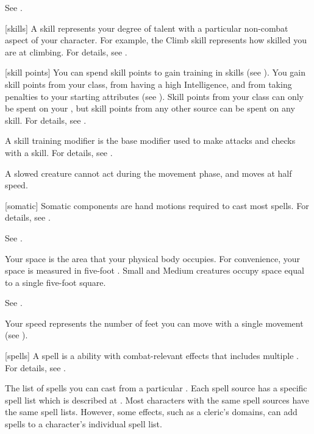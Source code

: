  See .

[skills] A skill represents your degree of talent with a particular non-combat aspect of your character.
For example, the Climb skill represents how skilled you are at climbing.
For details, see .

[skill points] You can spend skill points to gain training in skills (see ).
You gain skill points from your class, from having a high Intelligence, and from taking penalties to your starting attributes (see ).
Skill points from your class can only be spent on your , but skill points from any other source can be spent on any skill.
For details, see .

 A skill training modifier is the base modifier used to make attacks and checks with a skill.
For details, see .

 A slowed creature cannot act during the movement phase, and moves at half speed.

[somatic] Somatic components are hand motions required to cast most spells.
For details, see .

 See .

 Your space is the area that your physical body occupies.
For convenience, your space is measured in five-foot .
Small and Medium creatures occupy space equal to a single five-foot square.

 See .

 Your speed represents the number of feet you can move with a single movement (see ).

[spells] A spell is a  ability with combat-relevant effects that includes multiple .
For details, see .

 The list of spells you can cast from a particular .
Each spell source has a specific spell list which is described at .
Most characters with the same spell sources have the same spell lists.
However, some effects, such as a cleric's domains, can add spells to a character's individual spell list.

